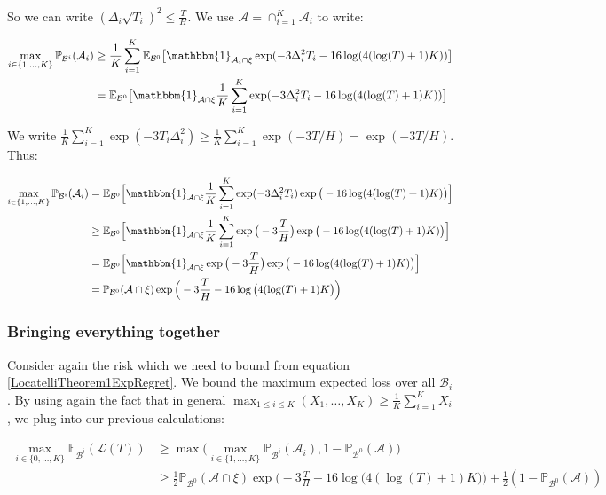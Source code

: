 \documentclass[11pt,]{article}
\begin{document}
So we can write \((\Delta_i \sqrt{T_i})^2 \leq \frac{T}{H}\). We use
\(\mathcal{A} = \cap_{i=1}^K \mathcal{A}_i\) to write:

\begin{align*}
\max_{i \in \{1,\dots,K\}} \mathbb{P}_{\mathcal{B}^i}(\mathcal{A}_i) & \geq \frac{1}{K} \sum_{i=1}^{K} \mathbb{E}_{\mathcal{B}^0} \big[\mathbbm{1}_{\mathcal{A}_i \cap \xi} \exp (- 3 \Delta_i^2 T_i - 16 \log(4(\log(T)+1)K)) \big] \\
& = \mathbb{E}_{\mathcal{B}^0} \big[\mathbbm{1}_{\mathcal{A} \cap \xi} \frac{1}{K} \sum_{i=1}^{K} \exp (- 3 \Delta_i^2 T_i - 16 \log(4(\log(T)+1)K)) \big]
\end{align*}

We write
\(\frac{1}{K} \sum_{i=1}^K \exp(-3T_i \Delta_i^2) \geq \frac{1}{K} \sum_{i=1}^K \exp(-3 T/H) = \exp(-3 T/H)\).
Thus:

\begin{align*}
\max_{i \in \{1,\dots,K\}} \mathbb{P}_{\mathcal{B}^i}(\mathcal{A}_i) & = \mathbb{E}_{\mathcal{B}^0} \Big[\mathbbm{1}_{\mathcal{A} \cap \xi} \frac{1}{K} \sum_{i=1}^{K} \exp (- 3 \Delta_i^2 T_i) \exp \big(-16 \log(4(\log(T)+1)K)\big) \Big] \\
& \geq \mathbb{E}_{\mathcal{B}^0} \Big[\mathbbm{1}_{\mathcal{A} \cap \xi} \frac{1}{K} \sum_{i=1}^{K} \exp \big(- 3 \frac{T}{H}\big) \exp \big(-16 \log(4(\log(T)+1)K)\big) \Big] \\
& = \mathbb{E}_{\mathcal{B}^0} \Big[\mathbbm{1}_{\mathcal{A} \cap \xi} \exp \big(- 3 \frac{T}{H}\big) \exp \big(-16 \log(4(\log(T)+1)K)\big) \Big] \\
& = \mathbb{P}_{\mathcal{B}^0} (\mathcal{A} \cap \xi) \exp \Big(- 3 \frac{T}{H} -16 \log \big(4(\log(T)+1)K\big)\Big)
\end{align*}

\subsubsection{Bringing everything
together}\label{bringing-everything-together}

Consider again the risk which we need to bound from equation
\eqref{LocatelliTheorem1ExpRegret}. We bound the maximum expected loss
over all \(\mathcal{B}_i\). By using again the fact that in general
\(\max_{1 \leq i \leq K} (X_1, \dots, X_K) \geq \frac{1}{K} \sum_{i = 1}^K X_i\),
we plug into our previous calculations:

\begin{align}
\max_{i \in \{0, \dots, K\}} \mathbb{E}_{\mathcal{B}^i} (\mathcal{L}(T)) & \geq \max \big( \max_{i \in \{1, \dots, K\}} \mathbb{P}_{\mathcal{B}^i}(\mathcal{A}_i), 1 - \mathbb{P}_{\mathcal{B}^0}(\mathcal{A}) \big) \\
& \geq \frac{1}{2}\mathbb{P}_{\mathcal{B}^0} (\mathcal{A} \cap \xi) \exp \Big(- 3 \frac{T}{H} -16 \log \big(4(\log(T)+1)K\big)\Big) + \frac{1}{2}(1 - \mathbb{P}_{\mathcal{B}^0}(\mathcal{A})) \label{LocatelliTheorem1DefinitionOfRisk}
\end{align}
\end{document}
